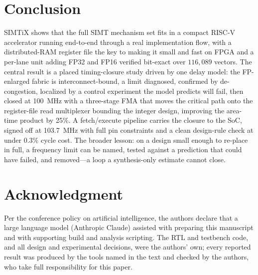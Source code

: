 \documentclass[10pt,conference]{IEEEtran}
\newif\ifanon
\begin{document}
\section{Conclusion}
SIMTiX shows that the full SIMT mechanism set fits in a compact RISC-V
accelerator running end-to-end through a real implementation flow, with a
distributed-RAM register file the key to making it small and fast on FPGA and a
per-lane unit adding FP32 and FP16 verified bit-exact over $116{,}089$ vectors.
The central result is a placed
timing-closure study driven by one delay model: the FP-enlarged fabric is
interconnect-bound, a limit diagnosed, confirmed by de-congestion, localized by a
control experiment the model predicts will fail, then closed at 100~MHz with a
three-stage FMA that moves the critical path onto the register-file read
multiplexer bounding the integer design, improving the area-time product by 25\%.
A fetch/execute pipeline carries the closure to the SoC, signed off at 103.7~MHz
with full pin constraints and a clean design-rule check at under 0.3\% cycle cost.
The broader lesson: on a design small enough to re-place in full, a frequency
limit can be named, tested against a prediction that could have failed, and
removed---a loop a synthesis-only estimate cannot close.

\section*{Acknowledgment}
Per the conference policy on artificial intelligence, the authors declare that a
large language model (Anthropic Claude) assisted with preparing this manuscript
and with supporting build and analysis scripting. The RTL and testbench code, and
all design and experimental decisions, were the authors' own; every reported
result was produced by the tools named in the text and checked by the authors, who
take full responsibility for this paper.
\ifanon\else
\fi
\end{document}
